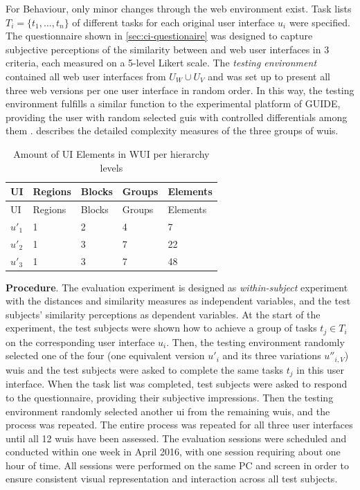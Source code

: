 For Behaviour, only minor changes through the \gls{web} environment exist.
Task lists \(T_i = \{t_1,\ldots,t_n\}\) of different tasks for each original user interface \(u_i\) were specified.
The questionnaire shown in \cref{sec:ci-questionaire} was designed to capture subjective perceptions of the similarity between  and \gls{web} user interfaces in 3 criteria, each measured on a 5-level Likert scale.
The \emph{testing environment} contained all \gls{web} user interfaces from \(U_W \cup U_V\) and was set up to present all three \gls{web} versions per one  user interface in random order.
In this way, the testing environment fulfills a similar function to the experimental platform of GUIDE, providing the user with random selected \glspl{gui} with controlled differentials among them \autocite{Grechanik2018}.
 describes the detailed complexity measures of the three groups of \glspl{wui}.

\hypertarget{tbl:ci:hierarchy}{}
\begin{longtable}[t]{@{}lllll@{}}
\caption{\label{tbl:ci:hierarchy}Amount of UI Elements in WUI per hierarchy levels}\tabularnewline
\toprule
UI & Regions & Blocks & Groups & Elements\tabularnewline
\midrule
\endfirsthead
\toprule
UI & Regions & Blocks & Groups & Elements\tabularnewline
\midrule
\endhead
\(u'_1\) & 1 & 2 & 4 & 7\tabularnewline
\(u'_2\) & 1 & 3 & 7 & 22\tabularnewline
\(u'_3\) & 1 & 3 & 7 & 48\tabularnewline
\bottomrule
\end{longtable}

\textbf{Procedure}. The evaluation experiment is designed as \emph{within-subject} experiment with the distances and similarity measures as independent variables, and the test subjects' similarity perceptions as dependent variables.
At the start of the experiment, the test subjects were shown how to achieve a group of tasks \(t_j \in T_i\) on the corresponding  user interface \(u_i\).
Then, the testing environment randomly selected one of the four (one equivalent version \(u'_i\) and its three variations \(u''_{i,V}\)) \glspl{wui} and the test subjects were asked to complete the same tasks \(t_j\) in this user interface.
When the task list was completed, test subjects were asked to respond to the questionnaire, providing their subjective impressions.
Then the testing environment randomly selected another \gls{ui} from the remaining \glspl{wui}, and the process was repeated.
The entire process was repeated for all three  user interfaces until all 12 \glspl{wui} have been assessed.
The evaluation sessions were scheduled and conducted within one week in April 2016, with one session requiring about one hour of time.
All sessions were performed on the same PC and screen in order to ensure consistent visual representation and interaction across all test subjects.

